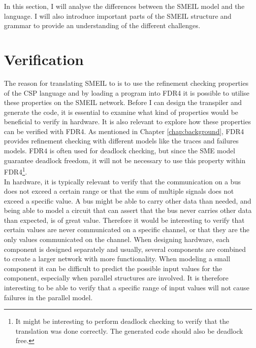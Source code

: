 


In this section, I will analyse the differences between the SMEIL model and the \cspm{} language. I will also introduce important parts of the SMEIL structure and grammar to provide an understanding of the different challenges.
\section{Verification}
\label{sec:analysis_verification}
The reason for translating SMEIL to \cspm{} is to use the refinement checking properties of the CSP language and by loading a \cspm{} program into FDR4 it is possible to utilise these properties on the SMEIL network. Before I can design the transpiler and generate the \cspm{} code, it is essential to examine what kind of properties would be beneficial to verify in hardware. It is also relevant to explore how these properties can be verified with FDR4. As mentioned in Chapter \ref{chap:background}, FDR4 provides refinement checking with different models like the traces and failures models. FDR4 is often used for deadlock checking, but since the SME model guarantee deadlock freedom, it will not be necessary to use this property within FDR4\footnote{It might be interesting to perform deadlock checking to verify that the translation was done correctly. The generated \cspm{} code should also be deadlock free.}.\\

In hardware, it is typically relevant to verify that the communication on a bus does not exceed a certain range or that the sum of multiple signals does not exceed a specific value. A bus might be able to carry other data than needed, and being able to model a circuit that can assert that the bus never carries other data than expected, is of great value. Therefore it would be interesting to verify that certain values are never communicated on a specific channel, or that they are the only values communicated on the channel. When designing hardware, each component is designed separately and usually, several components are combined to create a larger network with more functionality. When modeling a small component it can be difficult to predict the possible input values for the component, especially when parallel structures are involved. It is therefore interesting to be able to verify that a specific range of input values will not cause failures in the parallel model.\\

